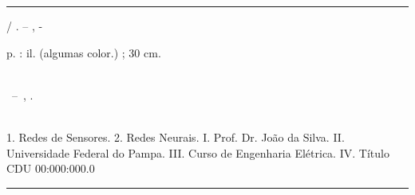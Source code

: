 
\vspace*{\fill}					%
\hrule							%
\begin{center}					%
	\begin{minipage}[c]{12.5cm}		%
	
		\imprimirautor
	
		\hspace{0.5cm} \imprimirtitulo  / \imprimirautor. --
		\imprimirlocal, \imprimirdata-
	
		\hspace{0.5cm} \pageref{LastPage} p. : il. (algumas color.) ; 30 cm.\\
	
		\hspace{0.5cm} \imprimirorientadorRotulo~\imprimirorientador\\
	
		\hspace{0.5cm}
		\parbox[t]{\textwidth}{\imprimirtipotrabalho~--~\imprimirinstituicao,
		\imprimirdata.}\\
	
		\hspace{0.5cm}
			1. Redes de Sensores.
			2. Redes Neurais.
			I. Prof. Dr. João da Silva.
			II. Universidade Federal do Pampa.
			III. Curso de Engenharia Elétrica.
			IV. Título\\ 			
	
		\hspace{8.75cm} CDU 00:000:000.0\\

	\end{minipage}
\end{center}
\hrule
